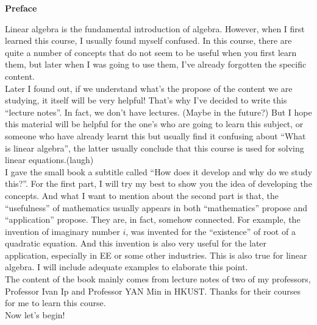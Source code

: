 \newpage


{\vspace{-1.2cm}\normalfont\fontsize{35}{25}\bfseries
Preface}

\vspace{2cm}

Linear algebra is the fundamental introduction of algebra. However, when I first learned this course, I usually found myself confused. In this course, there are quite a number of concepts that do not seem to be useful when you first learn them, but later when I was going to use them, I've already forgotten the specific content. \\

Later I found out, if we understand what's the propose of the content we are studying, it itself will be very helpful! That's why I've decided to write this ``lecture notes''. In fact, we don't have lectures. (Maybe in the future?) But I hope this material will be helpful for the one's who are going to learn this subject, or someone who have already learnt this but usually find it confusing about ``What is linear algebra'', the latter usually conclude that this course is used for solving linear equations.(laugh)\\

I gave the small book a subtitle called ``How does it develop and why do we study this?''. For the first part, I will try my best to show you the idea of developing the concepts. And what I want to mention about the second part is that, the ``usefulness'' of mathematics usually appears in both ``mathematics'' propose and ``application'' propose. They are, in fact, somehow connected. For example, the invention of imaginary number $i$, was invented for the ``existence'' of root of a quadratic equation. And this invention is also very useful for the later application, especially in EE or some other industries. This is also true for linear algebra. I will include adequate examples to elaborate this point.\\

The content of the book mainly comes from lecture notes of two of my professors, Professor Ivan Ip and Professor YAN Min in HKUST. Thanks for their courses for me to learn this course.\\

Now let's begin!\\

%
\pagestyle{fancy}
\fancyhf{}             %
\fancyfoot[C]{\thepage} %
